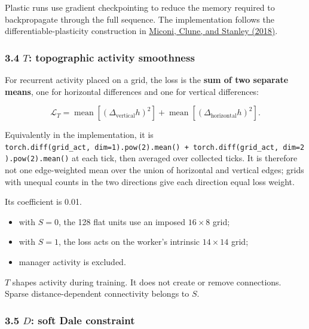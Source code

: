 \documentclass[
  10pt,
]{article}
\providecommand{\tightlist}{%
  \setlength{\itemsep}{0pt}\setlength{\parskip}{0pt}}
\begin{document}
Plastic runs use gradient checkpointing to reduce the memory required to
backpropagate through the full sequence. The implementation follows the
differentiable-plasticity construction in
\href{https://proceedings.mlr.press/v80/miconi18a.html}{Miconi, Clune,
and Stanley (2018)}.

\hypertarget{t-topographic-activity-smoothness}{%
\subsubsection{\texorpdfstring{3.4 \(T\): topographic activity
smoothness}{3.4 T: topographic activity smoothness}}\label{t-topographic-activity-smoothness}}

For recurrent activity placed on a grid, the loss is the \textbf{sum of
two separate means}, one for horizontal differences and one for vertical
differences:

\[
\mathcal L_T
=
\operatorname{mean}\!\left[(\Delta_{\mathrm{vertical}}h)^2\right]+
\operatorname{mean}\!\left[(\Delta_{\mathrm{horizontal}}h)^2\right].
\]

Equivalently in the implementation, it is
\texttt{torch.diff(grid\_act,\ dim=1).pow(2).mean()\ +\ torch.diff(grid\_act,\ dim=2).pow(2).mean()}
at each tick, then averaged over collected ticks. It is therefore not
one edge-weighted mean over the union of horizontal and vertical edges;
grids with unequal counts in the two directions give each direction
equal loss weight.

Its coefficient is 0.01.

\begin{itemize}
\tightlist
\item
  with \(S=0\), the 128 flat units use an imposed \(16\times8\) grid;
\item
  with \(S=1\), the loss acts on the worker's intrinsic \(14\times14\)
  grid;
\item
  manager activity is excluded.
\end{itemize}

\(T\) shapes activity during training. It does not create or remove
connections. Sparse distance-dependent connectivity belongs to \(S\).

\hypertarget{d-soft-dale-constraint}{%
\subsubsection{\texorpdfstring{3.5 \(D\): soft Dale
constraint}{3.5 D: soft Dale constraint}}\label{d-soft-dale-constraint}}
\end{document}
